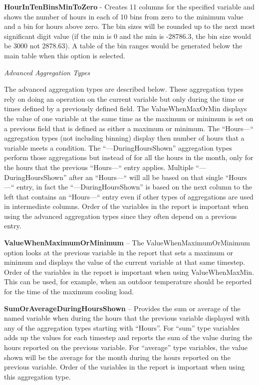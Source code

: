 \textbf{HourInTenBinsMinToZero} - Creates 11 columns for the specified variable and shows the number of hours in each of 10 bins from zero to the minimum value and a bin for hours above zero. The bin sizes will be rounded up to the next most significant digit value (if the min is 0 and the min is -28786.3, the bin size would be 3000 not 2878.63). A table of the bin ranges would be generated below the main table when this option is selected.

\emph{Advanced Aggregation Types}

The advanced aggregation types are described below. These aggregation types rely on doing an operation on the current variable but only during the time or times defined by a previously defined field. The ValueWhenMaxOrMin displays the value of one variable at the same time as the maximum or minimum is set on a previous field that is defined as either a maximum or minimum. The ``Hours---`` aggregation types (not including binning) display then number of hours that a variable meets a condition. The ``---DuringHoursShown'' aggregation types perform those aggregations but instead of for all the hours in the month, only for the hours that the previous ``Hours---`` entry applies. Multiple ``---DuringHoursShown'' after an ``Hours---`` will all be based on that single ``Hours---`` entry, in fact the ``---DuringHoursShown'' is based on the next column to the left that contains an ``Hours---`` entry even if other types of aggregations are used in intermediate columns. Order of the variables in the report is important when using the advanced aggregation types since they often depend on a previous entry.

\textbf{ValueWhenMaximumOrMinimum} -- The ValueWhenMaximumOrMinimum option looks at the previous variable in the report that sets a maximum or minimum and displays the value of the current variable at that same timestep. Order of the variables in the report is important when using ValueWhenMaxMin. This can be used, for example, when an outdoor temperature should be reported for the time of the maximum cooling load.

\textbf{SumOrAverageDuringHoursShown} -- Provides the sum or average of the named variable when during the hours that the previous variable displayed with any of the aggregation types starting with ``Hours''. For ``sum'' type variables adds up the values for each timestep and reports the sum of the value during the hours reported on the previous variable. For ``average'' type variables, the value shown will be the average for the month during the hours reported on the previous variable. Order of the variables in the report is important when using this aggregation type.

